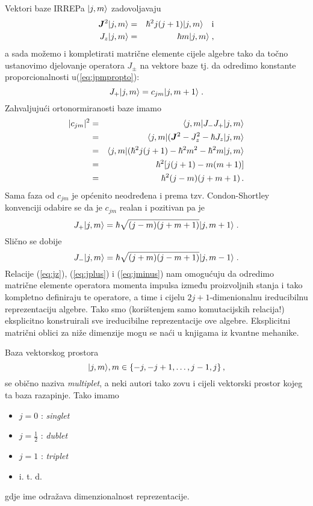 Vektori baze IRREPa $| j, m \rangle$ zadovoljavaju
\begin{eqnarray}
 \jsq \ket{j, m}& = & \hbar^2 j(j+1)\ket{j, m} \quad \mbox{i} \\
 J_z \ket{j, m} & =  &\hbar m \ket{j, m} \;, \label{eq:jz}
\end{eqnarray}
a sada možemo i kompletirati matrične elemente cijele algebre tako
da točno ustanovimo djelovanje operatora $J_\pm$ na vektore baze
tj. da odredimo konstante proporcionalnosti u(\ref{eq:jpmpropto}):
\begin{equation}
     J_+ | j, m \rangle = c_{jm} | j, m+1 \rangle \;.
\end{equation}
Zahvaljujući ortonormiranosti baze imamo
\begin{eqnarray*}
 |c_{jm}|^2 & = & \bra{j, m} J_- J_+ \ket{j, m} \\
            & = & \bra{j, m}(\jsq - J_{z}^2 - \hbar J_z \ket{j, m} \\
& = & \bra{j, m}(\hbar^2 j(j+1) - \hbar^2 m^2 - \hbar^2 m \ket{j, m}  \\
            & = & \hbar^2[j(j+1)-m(m+1)] \\
            & = & \hbar^2 (j-m)(j+m+1) \,.
\end{eqnarray*}
Sama faza od $c_{jm}$ je općenito neodređena i prema tzv. Condon-Shortley konvenciji
odabire se da je $c_{jm}$ realan i pozitivan pa je
\begin{equation}
  J_+ | j, m \rangle = \hbar \sqrt{(j-m)(j+m+1)} | j, m+1 \rangle \;.
\label{eq:jplus}
\end{equation}
Slično se dobije
\begin{equation}
  J_- | j, m \rangle = \hbar \sqrt{(j+m)(j-m+1)} | j, m-1 \rangle \;.
\label{eq:jminus}
\end{equation}
Relacije (\ref{eq:jz}), (\ref{eq:jplus}) i (\ref{eq:jminus}) 
nam omogućuju da odredimo matrične elemente operatora
momenta impulsa između proizvoljnih stanja i tako kompletno definiraju
te operatore, a time i cijelu $2j+1$-dimenionalnu ireducibilnu reprezentaciju
 algebre. Tako smo (korištenjem samo komutacijskih relacija!) eksplicitno
konstruirali sve ireducibilne reprezentacije ove algebre. Eksplicitni 
matrični oblici za niže dimenzije mogu se naći u knjigama iz kvantne
mehanike.

Baza vektorskog prostora 
\[| j, m \rangle, m\in\{-j, -j+1, \ldots, j-1, j\}\,,\] 
se obično naziva \emph{multiplet}, a neki autori tako zovu i cijeli
vektorski prostor kojeg ta baza razapinje. Tako imamo
\begin{itemize}
\item  $j=0$ : \emph{singlet}
\item  $j=\frac{1}{2}$ : \emph{dublet}
\item  $j=1$ : \emph{triplet}
\item  i. t. d.
\end{itemize}
gdje ime odražava dimenzionalnost reprezentacije.

